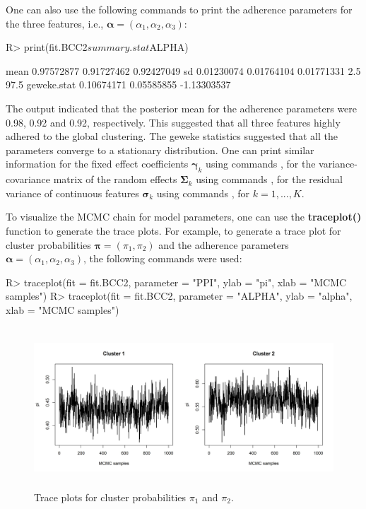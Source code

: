 One can also use the following commands to print the adherence parameters for the three features, i.e., $\boldsymbol{\alpha}=(\alpha_1,\alpha_2,\alpha_3)$:
 
\begin{example}
R> print(fit.BCC2$summary.stat$ALPHA)
\end{example} 
\begin{example}
                  [,1]       [,2]        [,3]
mean        0.97572877 0.91727462  0.92427049
sd          0.01230074 0.01764104  0.01771331
2.5%
97.5%
geweke.stat 0.10674171 0.05585855 -1.13303537
\end{example}

The output indicated that the posterior mean for the adherence parameters were 0.98, 0.92 and 0.92, respectively. This suggested that all three features highly adhered to the global clustering. The geweke statistics suggested that all the parameters converge to a stationary distribution. One can print similar information for the fixed effect coefficients $\boldsymbol{\gamma}_k$ using commands , for the variance-covariance matrix of the random effects $\boldsymbol{\Sigma}_k$ using commands , for the residual variance of continuous features $\boldsymbol{\sigma}_k$ using commands , for $k=1,...,K$. 

To visualize the MCMC chain for model parameters, one can use the  \textbf{traceplot()} function to generate the trace plots. For example, to generate a trace plot for cluster probabilities $\boldsymbol{\pi} = (\pi_1, \pi_2)$ and the adherence parameters $\boldsymbol{\alpha}=(\alpha_1,\alpha_2,\alpha_3)$, the following commands were used: 

\begin{example}
R> traceplot(fit = fit.BCC2, parameter = "PPI", ylab = "pi", xlab = "MCMC samples")
R> traceplot(fit = fit.BCC2, parameter = "ALPHA", ylab = "alpha", xlab = "MCMC samples")
\end{example} 

\begin{figure}[h]
\centering
\includegraphics[width=\textwidth,height=6cm]{./Figures/trace_ppi.JPEG}
\caption{\label{fig:trace_ppi}  Trace plots for cluster probabilities $\pi_1$ and $\pi_2$.}
\end{figure}

